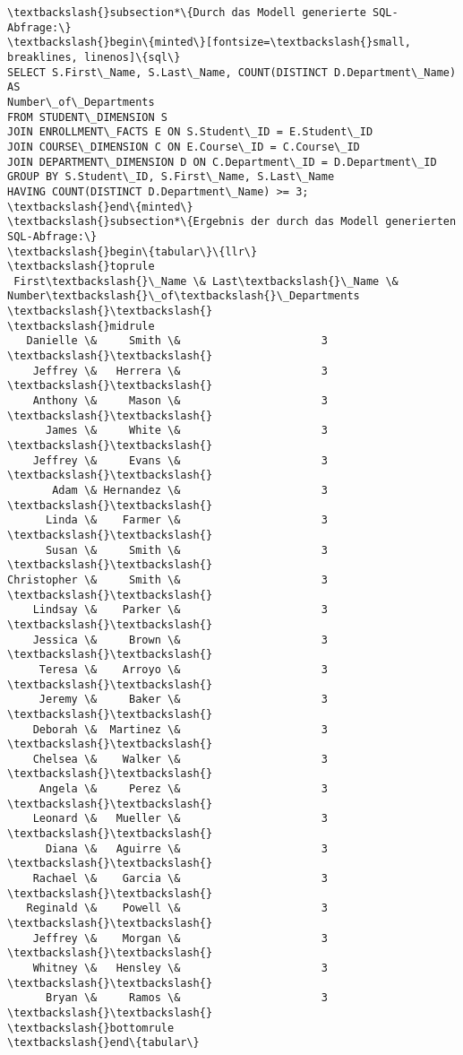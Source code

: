 \documentclass[11pt]{article}
\begin{document}
\begin{Verbatim}[commandchars=\\\{\}]
\textbackslash{}subsection*\{Durch das Modell generierte SQL-Abfrage:\}
\textbackslash{}begin\{minted\}[fontsize=\textbackslash{}small, breaklines, linenos]\{sql\}
SELECT S.First\_Name, S.Last\_Name, COUNT(DISTINCT D.Department\_Name) AS
Number\_of\_Departments
FROM STUDENT\_DIMENSION S
JOIN ENROLLMENT\_FACTS E ON S.Student\_ID = E.Student\_ID
JOIN COURSE\_DIMENSION C ON E.Course\_ID = C.Course\_ID
JOIN DEPARTMENT\_DIMENSION D ON C.Department\_ID = D.Department\_ID
GROUP BY S.Student\_ID, S.First\_Name, S.Last\_Name
HAVING COUNT(DISTINCT D.Department\_Name) >= 3;
\textbackslash{}end\{minted\}
\textbackslash{}subsection*\{Ergebnis der durch das Modell generierten SQL-Abfrage:\}
\textbackslash{}begin\{tabular\}\{llr\}
\textbackslash{}toprule
 First\textbackslash{}\_Name \& Last\textbackslash{}\_Name \&  Number\textbackslash{}\_of\textbackslash{}\_Departments \textbackslash{}\textbackslash{}
\textbackslash{}midrule
   Danielle \&     Smith \&                      3 \textbackslash{}\textbackslash{}
    Jeffrey \&   Herrera \&                      3 \textbackslash{}\textbackslash{}
    Anthony \&     Mason \&                      3 \textbackslash{}\textbackslash{}
      James \&     White \&                      3 \textbackslash{}\textbackslash{}
    Jeffrey \&     Evans \&                      3 \textbackslash{}\textbackslash{}
       Adam \& Hernandez \&                      3 \textbackslash{}\textbackslash{}
      Linda \&    Farmer \&                      3 \textbackslash{}\textbackslash{}
      Susan \&     Smith \&                      3 \textbackslash{}\textbackslash{}
Christopher \&     Smith \&                      3 \textbackslash{}\textbackslash{}
    Lindsay \&    Parker \&                      3 \textbackslash{}\textbackslash{}
    Jessica \&     Brown \&                      3 \textbackslash{}\textbackslash{}
     Teresa \&    Arroyo \&                      3 \textbackslash{}\textbackslash{}
     Jeremy \&     Baker \&                      3 \textbackslash{}\textbackslash{}
    Deborah \&  Martinez \&                      3 \textbackslash{}\textbackslash{}
    Chelsea \&    Walker \&                      3 \textbackslash{}\textbackslash{}
     Angela \&     Perez \&                      3 \textbackslash{}\textbackslash{}
    Leonard \&   Mueller \&                      3 \textbackslash{}\textbackslash{}
      Diana \&   Aguirre \&                      3 \textbackslash{}\textbackslash{}
    Rachael \&    Garcia \&                      3 \textbackslash{}\textbackslash{}
   Reginald \&    Powell \&                      3 \textbackslash{}\textbackslash{}
    Jeffrey \&    Morgan \&                      3 \textbackslash{}\textbackslash{}
    Whitney \&   Hensley \&                      3 \textbackslash{}\textbackslash{}
      Bryan \&     Ramos \&                      3 \textbackslash{}\textbackslash{}
\textbackslash{}bottomrule
\textbackslash{}end\{tabular\}

    \end{Verbatim}


    
    
    
\end{document}
